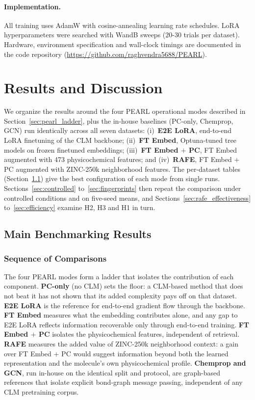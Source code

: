 \documentclass[pdflatex,sn-mathphys-num,Numbered]{sn-jnl}%
\begin{document}
\paragraph{Implementation.} All training uses AdamW with cosine-annealing learning rate schedules. LoRA hyperparameters were searched with WandB sweeps ($20$-$30$ trials per dataset). Hardware, environment specification and wall-clock timings are documented in the code repository (\url{https://github.com/raghvendra5688/PEARL}).

\section{Results and Discussion}\label{sec:results_discussion}

We organize the results around the four PEARL operational modes described in Section~\ref{sec:pearl_ladder}, plus the in-house baselines (PC-only, Chemprop, GCN) run identically across all seven datasets: (i)~\textbf{E2E LoRA}, end-to-end LoRA finetuning of the CLM backbone; (ii)~\textbf{FT Embed}, Optuna-tuned tree models on frozen finetuned embeddings; (iii)~\textbf{FT Embed $+$ PC}, FT Embed augmented with 473 physicochemical features; and (iv)~\textbf{RAFE}, FT Embed $+$ PC augmented with ZINC-250k neighborhood features. The per-dataset tables (Section~\ref{sec:main_results}) give the best configuration of each mode from single runs. Sections~\ref{sec:controlled} to~\ref{sec:fingerprints} then repeat the comparison under controlled conditions and on five-seed means, and Sections~\ref{sec:rafe_effectiveness} to~\ref{sec:efficiency} examine H2, H3 and H1 in turn.

\subsection{Main Benchmarking Results}\label{sec:main_results}

\subsubsection{Sequence of Comparisons}\label{sec:comparison_sequence}
The four PEARL modes form a ladder that isolates the contribution of each component. \textbf{PC-only} (no CLM) sets the floor: a CLM-based method that does not beat it has not shown that its added complexity pays off on that dataset. \textbf{E2E LoRA} is the reference for end-to-end gradient flow through the backbone. \textbf{FT Embed} measures what the embedding contributes alone, and any gap to E2E LoRA reflects information recoverable only through end-to-end training. \textbf{FT Embed $+$ PC} isolates the physicochemical features, independent of retrieval. \textbf{RAFE} measures the added value of ZINC-250k neighborhood context: a gain over FT Embed $+$ PC would suggest information beyond both the learned representation and the molecule's own physicochemical profile. \textbf{Chemprop and GCN}, run in-house on the identical split and protocol, are graph-based references that isolate explicit bond-graph message passing, independent of any CLM pretraining corpus.
\end{document}
